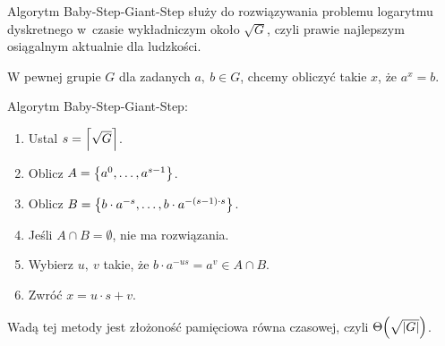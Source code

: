 Algorytm Baby-Step-Giant-Step służy do rozwiązywania problemu logarytmu dyskretnego w~czasie wykładniczym około \( \sqrt{G} \), czyli prawie najlepszym osiągalnym aktualnie dla ludzkości.

W pewnej grupie \( G \) dla zadanych \(a, \ b \in G \), chcemy obliczyć takie \( x \), że \( a^x = b \).
\begin{greyframe}
    Algorytm Baby-Step-Giant-Step:
    \begin{enumerate}
    \item Ustal \( s = \left\lceil\sqrt{G}\right\rceil \).
    \item Oblicz \( A = \set{a^0, \dots, a^{s-1}} \).
    \item Oblicz \( B = \set{b\cdot a^{-s}, \dots,  b\cdot a^{-(s-1) \cdot s}} \).
    \item Jeśli \( A \cap B = \emptyset \), nie ma rozwiązania.
    \item Wybierz \( u, \ v \) takie, że \( b\cdot a^{-us} = a^v \in A \cap B \). \item Zwróć \( x = u \cdot s + v \).
    \end{enumerate}
\end{greyframe}

Wadą tej metody jest złożoność pamięciowa równa czasowej, czyli \( \Theta\pars{\sqrt{\abs{G}}} \).
